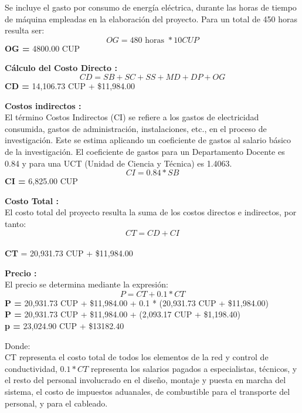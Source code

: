 Se incluye el gasto por consumo de energía eléctrica, durante las horas de tiempo de máquina empleadas
en la elaboración del proyecto. Para un total de 450 horas resulta ser:
\begin{equation}
    OG = 480 \text{ horas } * 10 CUP
\end{equation}
\textbf{OG =} 4800.00 CUP

\textbf{Cálculo del Costo Directo :}\\
\begin{equation}
    CD = SB + SC + SS + MD + DP + OG
\end{equation}
\textbf{CD =} 14,106.73  CUP + \$11,984.00

\textbf{Costos indirectos :}\\
El término Costos Indirectos (CI) se refiere a los gastos de electricidad consumida, gastos de administración,
instalaciones, etc., en el proceso de investigación. Este se estima aplicando un coeficiente de gastos al
salario básico de la investigación. El coeficiente de gastos para un Departamento Docente es 0.84 y para una
UCT (Unidad de Ciencia y Técnica) es 1.4063.
\begin{equation}
    CI = 0.84 * SB
\end{equation}
\textbf{CI =} 6,825.00 CUP

\textbf{Costo Total :}\\
El costo total del proyecto resulta la suma de los costos directos e indirectos, por tanto:
\begin{equation}
    CT = CD + CI
\end{equation}\\
\textbf{CT} = 20,931.73 CUP + \$11,984.00

\textbf{Precio :}\\
El precio se determina mediante la expresión:
\begin{equation}
    P = CT + 0.1 * CT
\end{equation}
\textbf{P =} 20,931.73 CUP + \$11,984.00 + 0.1 * (20,931.73 CUP + \$11,984.00)\\
\textbf{P =} 20,931.73 CUP + \$11,984.00 +  (2,093.17 CUP + \$1,198.40)\\
\textbf{p =} 23,024.90 CUP + \$13182.40

Donde:\\
CT representa el costo total de todos los elementos de la red y control de conductividad, $0.1*CT$
representa los salarios pagados a especialistas, técnicos, y el resto del personal involucrado en el diseño,
montaje y puesta en marcha del sistema, el costo de impuestos aduanales, de combustible para el transporte del
personal, y para el cableado.

